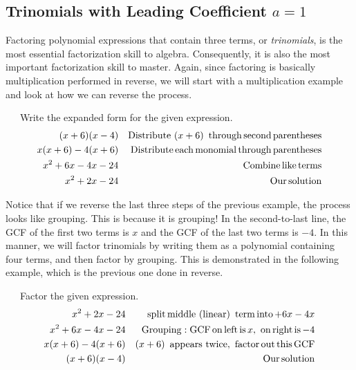 \subsection{Trinomials with Leading Coefficient $a=1$}\pp


{}\pp

Factoring polynomial expressions that contain three terms, or \textit{trinomials}, is the most essential
factorization skill to algebra.  Consequently, it is also the most important factorization skill to master.  Again, since factoring is basically multiplication performed in reverse, we will start with a multiplication example and look at how we can reverse the process.

\begin{example}~~~Write the expanded form for the given expression.
  \begin{eqnarray*}
    (x + 6) (x - 4) &  & \operatorname{Distribute~} (x + 6) \operatorname{~through}
    \operatorname{second} \operatorname{parentheses}\\
    x (x + 6) - 4 (x + 6) &  & \operatorname{Distribute} \operatorname{each} \operatorname{monomial}
    \operatorname{through} \operatorname{parentheses}\\
    x^2 + 6 x - 4 x - 24 &  & \operatorname{Combine} \operatorname{like} \operatorname{terms}\\
    x^2 + 2 x - 24 &  & \operatorname{Our} \operatorname{solution}
  \end{eqnarray*}
\end{example}	
	

Notice that if we reverse the last three steps of the previous example, the process looks like
grouping. This is because it is grouping! In the second-to-last line, the GCF of the first two terms is $x$
and the GCF of the last two terms is $- 4$. In this manner, we will factor
trinomials by writing them as a polynomial containing four terms, and then factor
by grouping. This is demonstrated in the following example, which is the previous one done in reverse.

\begin{example}~~~Factor the given expression.
  \begin{eqnarray*}
    x^2 + 2 x - 24 &  & \operatorname{~split} \operatorname{middle~(linear)~} \operatorname{term} \operatorname{into} + 6
    x - 4 x\\
    x^2 + 6 x - 4 x - 24 &  & \operatorname{Grouping} : \operatorname{GCF} \operatorname{on}
    \operatorname{left} \operatorname{is} x, \operatorname{~on} \operatorname{right} \operatorname{is} - 4\\
    x (x + 6) - 4 (x + 6) &  & (x + 6) \operatorname{~appears~twice},
    \operatorname{~factor} \operatorname{out} \operatorname{this} \operatorname{GCF}\\
    (x + 6) (x - 4) &  & \operatorname{Our} \operatorname{solution}
  \end{eqnarray*}
\end{example}	
  
